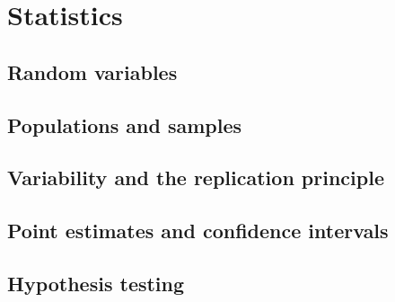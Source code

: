 \chapter{Statistics}

\section{Random variables}

\section{Populations and samples}

\section{Variability and the replication principle}

\section{Point estimates and confidence intervals}

\section{Hypothesis testing}

